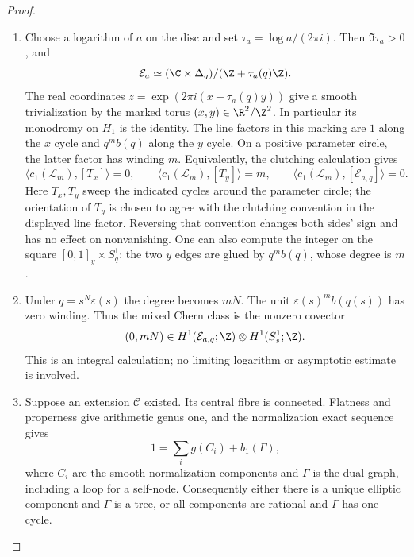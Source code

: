 \begin{proof}
\begin{enumerate}[label=\arabic*.,leftmargin=*]
\item Choose a logarithm of $a$ on the disc and set
$\tau_a=\log a/(2\pi i)$.  Then $\Im\tau_a>0$, and
\[
 \mathcal E_a\simeq
 (\C\times\Delta_q)/(\Z+\tau_a(q)\Z).
\]
The real coordinates $z=\exp(2\pi i(x+\tau_a(q)y))$
give a smooth trivialization by the marked torus
$(x,y)\in\R^2/\Z^2$.  In particular its monodromy on
$H_1$ is the identity.  The line factors in this marking
are $1$ along the $x$ cycle and $q^m b(q)$ along the
$y$ cycle.  On a positive parameter circle, the latter
factor has winding $m$.  Equivalently, the clutching
calculation gives
\[
 \langle c_1(\mathcal L_m),[T_x]\rangle=0,
 \qquad
 \langle c_1(\mathcal L_m),[T_y]\rangle=m,
 \qquad
 \langle c_1(\mathcal L_m),[\mathcal E_{a,q}]\rangle=0.
\]
Here $T_x,T_y$ sweep the indicated cycles around the
parameter circle; the orientation of $T_y$ is chosen to
agree with the clutching convention in the displayed
line factor.  Reversing that convention changes both
sides' sign and has no effect on nonvanishing.  One can
also compute the integer on the square
$[0,1]_y\times S^1_q$: the two $y$ edges are glued by
$q^m b(q)$, whose degree is $m$.

\item Under $q=s^N\varepsilon(s)$ the degree becomes $mN$.
The unit $\varepsilon(s)^m b(q(s))$ has zero winding.
Thus the mixed Chern class is the nonzero covector
\[
  (0,mN)\in
 H^1(\mathcal E_{a,q};\Z)\otimes H^1(S_s^1;\Z).
\]
This is an integral calculation; no limiting logarithm
or asymptotic estimate is involved.

\item Suppose an extension $\mathcal C$ existed.  Its central
fibre is connected.  Flatness and properness give arithmetic
genus one, and the normalization exact sequence gives
\[
 1=\sum_i g(C_i)+b_1(\Gamma),
\]
where $C_i$ are the smooth normalization components and
$\Gamma$ is the dual graph, including a loop for a
self-node.  Consequently either there is a unique
elliptic component and $\Gamma$ is a tree, or all
components are rational and $\Gamma$ has one cycle.


\end{enumerate}
\end{proof}
